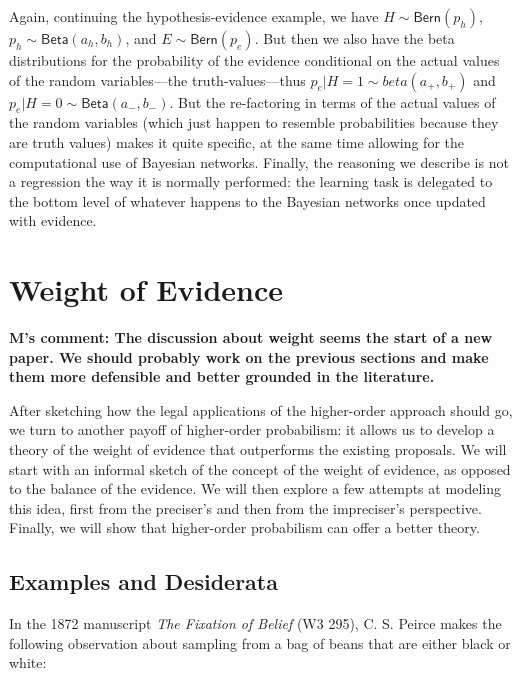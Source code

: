 \documentclass[
  10pt,
  dvipsnames,enabledeprecatedfontcommands]{scrartcl}
\begin{document}
Again, continuing the hypothesis-evidence example, we have
\(H \sim \mathsf{Bern}(p_h)\), \(p_h \sim \mathsf{Beta}(a_h, b_h)\), and
\(E\sim \mathsf{Bern}(p_e)\). But then we also have the beta
distributions for the probability of the evidence conditional on the
actual values of the random variables---the truth-values---thus
\(p_e \vert H = 1 \sim beta(a_{+}, b_{+} )\) and
\(p_e \vert H = 0 \sim \mathsf{Beta}(a_{-}, b_{-})\). But the
re-factoring in terms of the actual values of the random variables
(which just happen to resemble probabilities because they are truth
values) makes it quite specific, at the same time allowing for the
computational use of Bayesian networks. Finally, the reasoning we
describe is not a regression the way it is normally performed: the
learning task is delegated to the bottom level of whatever happens to
the Bayesian networks once updated with evidence.

\hypertarget{weight-of-evidence}{%
\section{Weight of Evidence}\label{weight-of-evidence}}

\label{sec:weight}


\textbf{M's comment: The discussion about weight seems the start of a new paper. We should probably work on the previous sections and make them more defensible and better grounded in the literature.}

After sketching how the legal applications of the higher-order approach
should go, we turn to another payoff of higher-order probabilism: it
allows us to develop a theory of the weight of evidence that outperforms
the existing proposals. We will start with an informal sketch of the
concept of the weight of evidence, as opposed to the balance of the
evidence. We will then explore a few attempts at modeling this idea,
first from the preciser's and then from the impreciser's perspective.
Finally, we will show that higher-order probabilism can offer a better
theory.

\hypertarget{examples-and-desiderata}{%
\subsection{Examples and Desiderata}\label{examples-and-desiderata}}

In the 1872 manuscript \emph{The Fixation of Belief} (W3 295), C. S.
Peirce makes the following observation about sampling from a bag of
beans that are either black or white:
\end{document}
